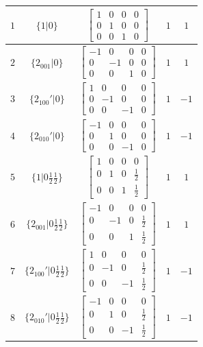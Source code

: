 \documentclass[fleqn,8pt]{jsarticle}
\begin{document}
\begin{longtable}{ccccc}
$ 1 $ & $ \{1|0\} $ & $ \begin{bmatrix} 1 & 0 & 0 & 0 \\ 0 & 1 & 0 & 0 \\ 0 & 0 & 1 & 0 \end{bmatrix} $ & $ 1 $ & $ 1 $ \\ \hline
$ 2 $ & $ \{2{}_{001}|0\} $ & $ \begin{bmatrix} -1 & 0 & 0 & 0 \\ 0 & -1 & 0 & 0 \\ 0 & 0 & 1 & 0 \end{bmatrix} $ & $ 1 $ & $ 1 $ \\ \hline
$ 3 $ & $ \{2{}_{100}{}'|0\} $ & $ \begin{bmatrix} 1 & 0 & 0 & 0 \\ 0 & -1 & 0 & 0 \\ 0 & 0 & -1 & 0 \end{bmatrix} $ & $ 1 $ & $ -1 $ \\ \hline
$ 4 $ & $ \{2{}_{010}{}'|0\} $ & $ \begin{bmatrix} -1 & 0 & 0 & 0 \\ 0 & 1 & 0 & 0 \\ 0 & 0 & -1 & 0 \end{bmatrix} $ & $ 1 $ & $ -1 $ \\ \hline
$ 5 $ & $ \{1|0 \frac{1}{2} \frac{1}{2}\} $ & $ \begin{bmatrix} 1 & 0 & 0 & 0 \\ 0 & 1 & 0 & \frac{1}{2} \\ 0 & 0 & 1 & \frac{1}{2} \end{bmatrix} $ & $ 1 $ & $ 1 $ \\ \hline
$ 6 $ & $ \{2{}_{001}|0 \frac{1}{2} \frac{1}{2}\} $ & $ \begin{bmatrix} -1 & 0 & 0 & 0 \\ 0 & -1 & 0 & \frac{1}{2} \\ 0 & 0 & 1 & \frac{1}{2} \end{bmatrix} $ & $ 1 $ & $ 1 $ \\ \hline
$ 7 $ & $ \{2{}_{100}{}'|0 \frac{1}{2} \frac{1}{2}\} $ & $ \begin{bmatrix} 1 & 0 & 0 & 0 \\ 0 & -1 & 0 & \frac{1}{2} \\ 0 & 0 & -1 & \frac{1}{2} \end{bmatrix} $ & $ 1 $ & $ -1 $ \\ \hline
$ 8 $ & $ \{2{}_{010}{}'|0 \frac{1}{2} \frac{1}{2}\} $ & $ \begin{bmatrix} -1 & 0 & 0 & 0 \\ 0 & 1 & 0 & \frac{1}{2} \\ 0 & 0 & -1 & \frac{1}{2} \end{bmatrix} $ & $ 1 $ & $ -1 $ \\ \hline

\end{longtable}
\end{document}
